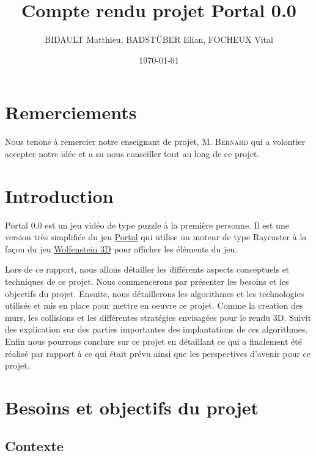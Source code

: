 \documentclass[11pt]{article}
\title{Compte rendu projet Portal 0.0}
\author{BIDAULT Matthieu, BADSTÜBER Elian, FOCHEUX Vital}
\date{\today}
\begin{document}
\maketitle

\newpage

\section*{Remerciements}

Nous tenons à remercier notre enseignant de projet, M. \textsc{Bernard} 
qui a volontier accepter notre idée et a su nous conseiller tout au long de ce projet.



\newpage

\tableofcontents

\newpage

\section{Introduction}

Portal 0.0 est un jeu vidéo de type puzzle à la première personne.
Il est une version très simplifiée du jeu \href{https://fr.wikipedia.org/wiki/Portal_(jeu_vid%C3%A9o)}{Portal}\cite{Portal}
qui utilise un moteur de type Raycaster à la façon du jeu
\href{https://fr.wikipedia.org/wiki/Wolfenstein_3D}{Wolfenstein 3D}\cite{Wolfenstein3D} pour afficher les éléments
du jeu.

Lors de ce rapport, nous allons détailler les différents aspects conceptuels et
techniques de ce projet. 
Nous commencerons par présenter les besoins et les objectifs du projet. 
Ensuite, nous détaillerons les algorithmes et les technologies utilisés et mis en place pour mettre en oeuvre ce projet.
Comme la creation des murs, les collisions et les différentes stratégies envisagées pour le rendu 3D.
Suivit des explication sur des parties importantes des implantations de ces algorithmes.
Enfin nous pourrons conclure sur ce projet en détaillant ce qui a finalement été réalisé par rapport à ce qui était prévu
ainsi que les perspectives d'avenir pour ce projet.

\section{Besoins et objectifs du projet}
\subsection{Contexte}
\end{document}
